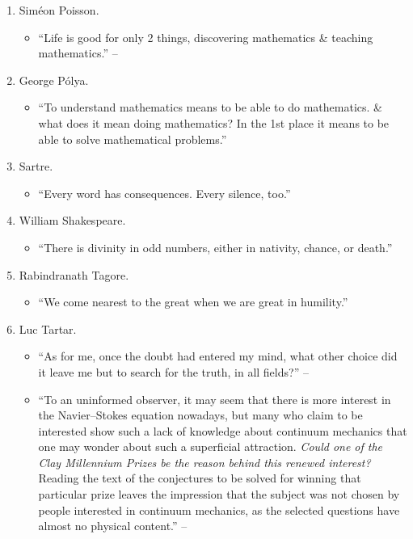 \documentclass{article}
\begin{document}
\begin{enumerate}
\begin{itemize}
	\end{itemize}
	\item {\sc Sim\'eon Poisson.}
	\begin{itemize}
		\item ``Life is good for only 2 things, discovering mathematics \& teaching mathematics.'' -- \cite[p. v]{Gelca_Andreescu2017}
	\end{itemize}
	\item {\sc George P\'olya.}
	\begin{itemize}
		\item ``To understand mathematics means to be able to do mathematics. \& what does it mean doing mathematics? In the 1st place it means to be able to solve mathematical problems.''
	\end{itemize}
	\item {\sc Sartre.}
	\begin{itemize}
		\item ``Every word has consequences. Every silence, too.''
	\end{itemize}
	\item {\sc William Shakespeare.}
	\begin{itemize}
		\item ``There is divinity in odd numbers, either in nativity, chance, or death.''
	\end{itemize}
	\item {\sc Rabindranath Tagore.}
	\begin{itemize}
		\item ``We come nearest to the great when we are great in humility.''
	\end{itemize}
	\item {\sc Luc Tartar.}
	\begin{itemize}
		\item ``As for me, once the doubt had entered my mind, what other choice did it leave me but to search for the truth, in all fields?'' -- \cite{Tartar2006}
		\item ``To an uninformed observer, it may seem that there is more interest in the Navier--Stokes equation nowadays, but many who claim to be interested show such a lack of knowledge about continuum mechanics that one may wonder about such a superficial attraction. {\it Could one of the Clay Millennium Prizes be the reason behind this renewed interest?} Reading the text of the conjectures to be solved for winning that particular prize leaves the impression that the subject was not chosen by people interested in continuum mechanics, as the selected questions have almost no physical content.'' -- \cite[Preface, p. vii]{Tartar2006}

\end{itemize}
\end{enumerate}
\end{document}
